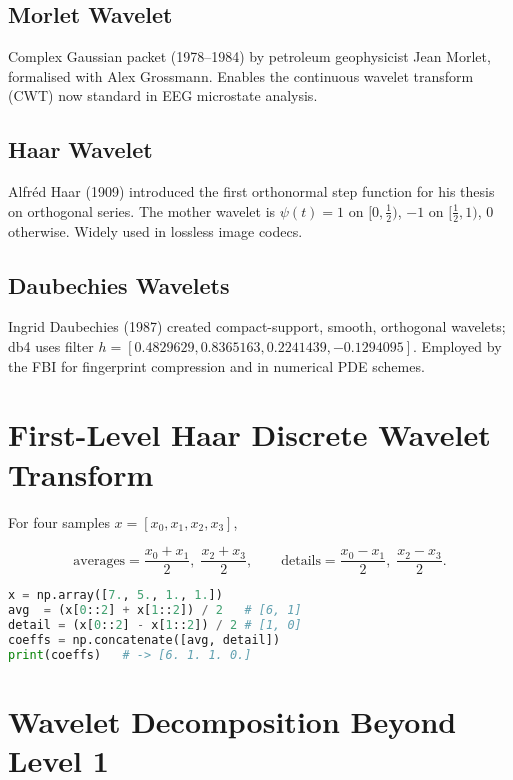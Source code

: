\documentclass[11pt]{article}
\begin{document}
\subsection{Morlet Wavelet}
Complex Gaussian packet (1978–1984) by petroleum geophysicist
Jean Morlet, formalised with Alex Grossmann.  Enables the continuous
wavelet transform (CWT) now standard in EEG microstate analysis.

\subsection{Haar Wavelet}
Alfréd Haar (1909) introduced the first orthonormal step function for his
thesis on orthogonal series.  The mother wavelet is
\(\psi(t)=1\) on \([0,\tfrac12)\), \(-1\) on \([\tfrac12,1)\), \(0\) otherwise.
Widely used in lossless image codecs.

\subsection{Daubechies Wavelets}
Ingrid Daubechies (1987) created compact-support, smooth, orthogonal
wavelets; db4 uses filter
\(h=[0.4829629, 0.8365163, 0.2241439,-0.1294095]\).
Employed by the FBI for fingerprint compression and in numerical PDE
schemes.

\section{First-Level Haar Discrete Wavelet Transform}

For four samples \(x=[x_0,x_1,x_2,x_3]\),

\[
\text{averages}=\frac{x_0+x_1}{2},\;\frac{x_2+x_3}{2},\qquad
\text{details}=\frac{x_0-x_1}{2},\;\frac{x_2-x_3}{2}.
\]

\begin{lstlisting}[language=Python,caption={Manual 4-sample Haar DWT}]
x = np.array([7., 5., 1., 1.])
avg  = (x[0::2] + x[1::2]) / 2   # [6, 1]
detail = (x[0::2] - x[1::2]) / 2 # [1, 0]
coeffs = np.concatenate([avg, detail])
print(coeffs)   # -> [6. 1. 1. 0.]
\end{lstlisting}

\section{Wavelet Decomposition Beyond Level 1}
\end{document}
